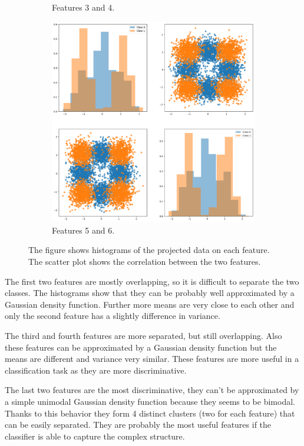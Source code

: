 \documentclass{article}
\begin{document}
\begin{figure}[ht]
\begin{subfigure}[b]{0.3\textwidth}
        \caption{Features 3 and 4.}
    \end{subfigure}
    \hfill
    \begin{subfigure}[b]{0.3\textwidth}
        \centering
        \includegraphics[width=\textwidth]{images/dataset_56.png}
        \caption{Features 5 and 6.}
    \end{subfigure}
    \caption{The figure shows histograms of the projected data on each feature. The scatter plot shows the correlation between the two features.}
    \label{fig:dataset}
\end{figure}

The first two features are mostly overlapping, so it is difficult to separate the two classes. The histograms show that they can be probably well approximated by a Gaussian density function. Further more means are very close to each other and only the second feature has a slightly difference in variance. 

The third and fourth features are more separated, but still overlapping. Also these features can be approximated by a Gaussian density function but the means are different and variance very similar. These features are more useful in a classification task as they are more discriminative.

The last two features are the most discriminative, they can't be approximated by a simple unimodal Gaussian density function because they seems to be bimodal. Thanks to this behavior they form 4 distinct clusters (two for each feature) that can be easily separated. They are probably the most useful features if the classifier is able to capture the complex structure.
\end{document}
